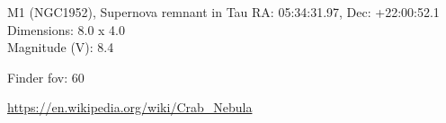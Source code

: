 \begin{block}{M1 (NGC1952), Supernova remnant in Tau}
    RA: 05:34:31.97, Dec: +22:00:52.1 \\ 
    Dimensions: 8.0 x 4.0 \\ 
    Magnitude (V): 8.4



    Finder fov: 60 

    \url{https://en.wikipedia.org/wiki/Crab_Nebula} 
\end{block}
